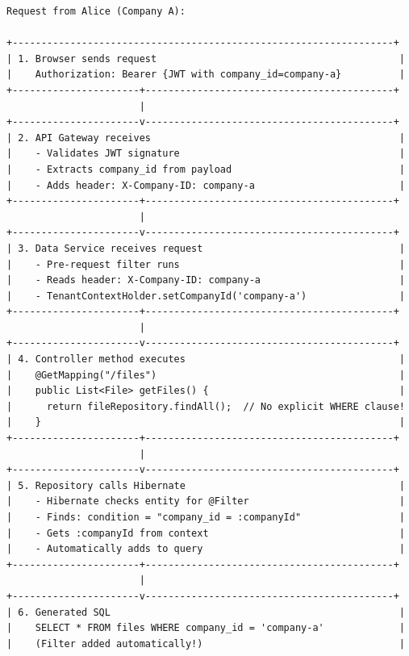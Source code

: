 \documentclass[11pt,a4paper]{report}
\begin{document}
\begin{lstlisting}[language=text]
Request from Alice (Company A):

+------------------------------------------------------------------+
| 1. Browser sends request                                          |
|    Authorization: Bearer {JWT with company_id=company-a}          |
+----------------------+-------------------------------------------+
                       |
+----------------------v-------------------------------------------+
| 2. API Gateway receives                                           |
|    - Validates JWT signature                                      |
|    - Extracts company_id from payload                             |
|    - Adds header: X-Company-ID: company-a                         |
+----------------------+-------------------------------------------+
                       |
+----------------------v-------------------------------------------+
| 3. Data Service receives request                                  |
|    - Pre-request filter runs                                      |
|    - Reads header: X-Company-ID: company-a                        |
|    - TenantContextHolder.setCompanyId('company-a')                |
+----------------------+-------------------------------------------+
                       |
+----------------------v-------------------------------------------+
| 4. Controller method executes                                     |
|    @GetMapping("/files")                                          |
|    public List<File> getFiles() {                                 |
|      return fileRepository.findAll();  // No explicit WHERE clause!
|    }                                                              |
+----------------------+-------------------------------------------+
                       |
+----------------------v-------------------------------------------+
| 5. Repository calls Hibernate                                     |
|    - Hibernate checks entity for @Filter                          |
|    - Finds: condition = "company_id = :companyId"                 |
|    - Gets :companyId from context                                 |
|    - Automatically adds to query                                  |
+----------------------+-------------------------------------------+
                       |
+----------------------v-------------------------------------------+
| 6. Generated SQL                                                  |
|    SELECT * FROM files WHERE company_id = 'company-a'             |
|    (Filter added automatically!)                                  |

\end{lstlisting}
\end{document}

